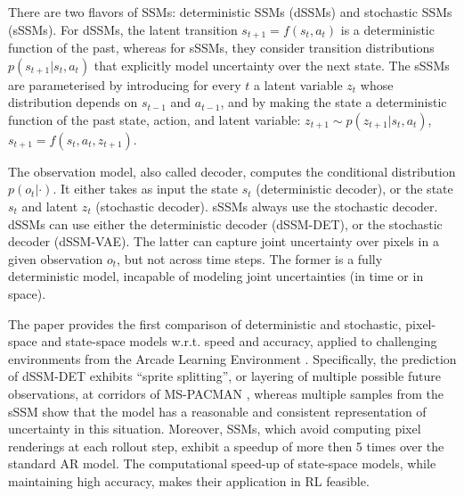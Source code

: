 There are two flavors of SSMs: deterministic SSMs (dSSMs) and stochastic SSMs (sSSMs). For dSSMs, the latent transition $s_{t+1} = f(s_t, a_t)$ is a deterministic function of the past, whereas for sSSMs, they consider transition distributions $p(s_{t+1}|s_t, a_t)$ that explicitly model uncertainty over the next state. The sSSMs are parameterised by introducing for every $t$ a latent variable $z_t$ whose distribution depends on $s_{t−1}$ and $a_{t−1}$, and by making the state a deterministic function of the past state, action, and latent variable: $z_{t+1} \sim p(z_{t+1}|s_t, a_t)$, $s_{t+1} = f(s_t, a_t, z_{t+1})$.

The observation model, also called decoder, computes the conditional distribution $p(o_t|\cdot)$. It either takes as input the state $s_t$ (deterministic decoder), or the state $s_t$ and latent $z_t$ (stochastic decoder). sSSMs always use the stochastic decoder. dSSMs can use either the deterministic decoder (dSSM-DET), or the stochastic decoder (dSSM-VAE). The latter can capture joint uncertainty over pixels in a given observation $o_t$, but not across time steps. The former is a fully deterministic model, incapable of modeling joint uncertainties (in time or in space).

The paper \cite{Algo.FastGenerativeModels} provides the first comparison of deterministic and stochastic, pixel-space and state-space models w.r.t. speed and accuracy, applied to challenging environments from the Arcade Learning Environment \cite{Code.ALE}. Specifically, the prediction of dSSM-DET exhibits “sprite splitting”, or layering of multiple possible future observations, at corridors of MS-PACMAN \cite{Game.MSPACMAN}, whereas multiple samples from the sSSM show that the model has a reasonable and consistent representation of uncertainty in this situation. Moreover, SSMs, which avoid computing pixel renderings at each rollout step, exhibit a speedup of more then 5 times over the standard AR model. The computational speed-up of state-space models, while maintaining high accuracy, makes their application in RL feasible.
